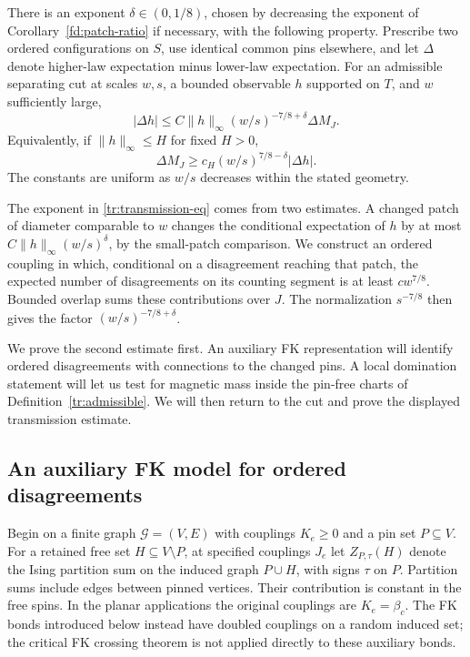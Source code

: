 \begin{proposition}[Transmission]
\label{tr:transmission}
There is an exponent $\delta\in(0,1/8)$, chosen by decreasing the exponent
of Corollary~\ref{fd:patch-ratio} if necessary, with the following property.
Prescribe two ordered configurations on $S$, use identical common pins
elsewhere, and let $\Delta$ denote higher-law expectation minus lower-law
expectation. For an admissible separating cut at scales $w,s$, a bounded
observable $h$ supported on $T$, and $w$ sufficiently large,
\begin{equation}
\label{tr:transmission-eq}
 |\Delta h|
 \leq C\|h\|_\infty (w/s)^{-7/8+\delta}\Delta M_J.
\end{equation}
Equivalently, if $\|h\|_\infty\leq H$ for fixed $H>0$,
\begin{equation}
\label{tr:transmission-lower}
 \Delta M_J\geq c_H (w/s)^{7/8-\delta}|\Delta h|.
\end{equation}
The constants are uniform as $w/s$ decreases within the stated geometry.
\end{proposition}

The exponent in \eqref{tr:transmission-eq} comes from two estimates.
A changed patch of diameter comparable to $w$ changes the conditional
expectation of $h$ by at most $C\|h\|_\infty(w/s)^\delta$, by the
small-patch comparison. We construct an ordered coupling in which,
conditional on a disagreement reaching that patch, the expected number
of disagreements on its counting segment is at least $cw^{7/8}$. Bounded overlap sums these contributions over
$J$. The normalization $s^{-7/8}$ then gives the factor
$(w/s)^{-7/8+\delta}$.

We prove the second estimate first. An auxiliary FK representation
will identify ordered disagreements with connections to the changed
pins. A local domination statement will let us test for magnetic mass
inside the pin-free charts of Definition~\ref{tr:admissible}. We will
then return to the cut and prove the displayed transmission estimate.
\subsection{An auxiliary FK model for ordered disagreements}
\label{tr:doubled-subsection}

Begin on a finite graph $\mathcal G=(V,E)$ with couplings $K_e\geq0$
and a pin set $P\subseteq V$. For a retained free set $H\subseteq V\setminus P$,
at specified couplings $J_e$ let $Z_{P,\tau}(H)$ denote the Ising
partition sum on the induced graph $P\cup H$, with signs $\tau$ on $P$. Partition sums include edges between
pinned vertices. Their contribution is constant in the free spins.
In the planar applications the original couplings are $K_e=\beta_c$.
The FK bonds introduced below instead have doubled couplings on a
random induced set; the critical FK crossing theorem is not applied
directly to these auxiliary bonds.


